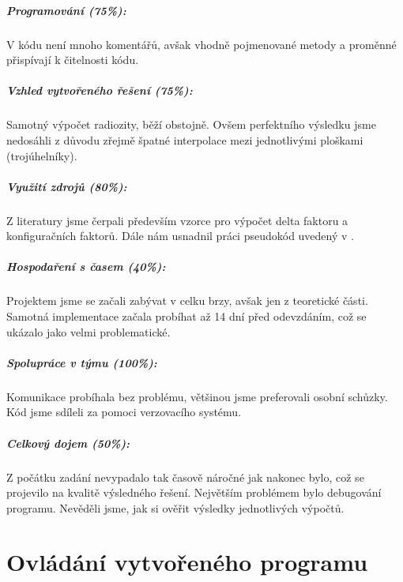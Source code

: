 \documentclass[12pt,a4paper,titlepage,final]{report}
\begin{document}
\paragraph{Programování (75\%):} V kódu není mnoho komentářů, avšak vhodně pojmenované metody a proměnné přispívají k čitelnosti kódu.

\paragraph{Vzhled vytvořeného řešení (75\%):} Samotný výpočet radiozity, běží obstojně. Ovšem perfektního výsledku jsme nedosáhli z důvodu zřejmě špatné interpolace mezi jednotlivými ploškami (trojúhelníky). 

\paragraph{Využití zdrojů (80\%):} Z literatury jsme čerpali především vzorce pro výpočet delta faktoru a konfiguračních faktorů. Dále nám usnadnil práci pseudokód uvedený v \cite{cite3}.

\paragraph{Hospodaření s časem (40\%):} Projektem jsme se začali zabývat v celku brzy, avšak jen z teoretické části. Samotná implementace začala probíhat až 14 dní před odevzdáním, což se ukázalo jako velmi problematické.

\paragraph{Spolupráce v týmu (100\%):} Komunikace probíhala bez problému, většinou jsme preferovali osobní schůzky. Kód jsme sdíleli za pomoci verzovacího systému. 

\paragraph{Celkový dojem (50\%):} Z počátku zadání nevypadalo tak časově náročné jak nakonec bylo, což se projevilo na kvalitě výsledného řešení. Největším problémem bylo debugování programu. Nevěděli jsme, jak si ověřit výsledky jednotlivých výpočtů.

\chapter{Ovládání vytvořeného programu}
\end{document}
